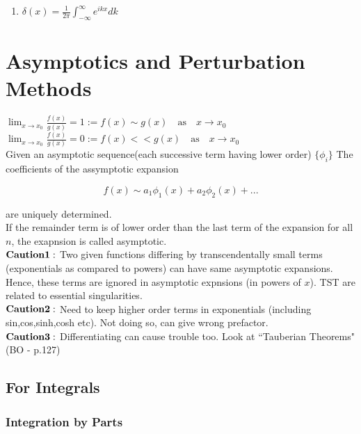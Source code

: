 \documentclass{report}
\begin{document}
\begin{enumerate}
  \item $\delta(x) = \frac{1}{2\pi}\int_{-\infty}^{\infty} e^{ikx} dk $
\end{enumerate}

\chapter{Asymptotics and Perturbation Methods}

$\lim_{x\to x_0} \frac{f(x)}{g(x)} = 1 := f(x) \sim g(x) \quad\mathrm{as}\quad  x\to x_0$\\

\noindent$\lim_{x\to x_0} \frac{f(x)}{g(x)} = 0 := f(x) << g(x)\quad\mathrm{as}\quad  x\to x_0$\\


\noindent Given an asymptotic sequence(each successive term having lower order) $\{\phi_i\}$ The coefficients of the assymptotic expansion 

$$ f(x) \sim a_1\phi_1(x) + a_2\phi_2(x) + ... $$

\noindent are uniquely determined.\\

\noindent If the remainder term is of lower order than the last term of the expansion for all $n$, the exapnsion is called asymptotic.\\

\noindent $\bold{Caution 1:}$ Two given functions differing by transcendentally small terms (exponentials as compared to powers) can have same asymptotic expansions. Hence, these terms are ignored in asymptotic expnsions (in powers of $x$). TST are related to essential singularities.\\

\noindent $\bold {Caution 2:}$ Need to keep higher order terms in exponentials (including sin,cos,sinh,cosh etc). Not doing so, can give wrong prefactor.\\

\noindent $\bold{Caution 3:}$ Differentiating can cause trouble too. Look at ``Tauberian Theorems" (BO - p.127)

\section{For Integrals}

\subsection{Integration by Parts}
\end{document}
